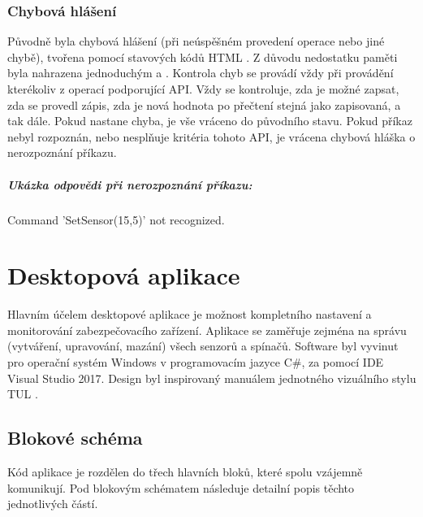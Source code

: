 \documentclass[FM,DP]{tulthesis}  %
\begin{document}
\subsection{Chybová hlášení}
Původně byla chybová hlášení (při neúspěšném provedení operace nebo jiné chybě), tvořena pomocí stavových kódů HTML \cite{HTML1.1}. Z důvodu nedostatku paměti byla nahrazena jednoduchým  a . Kontrola chyb se provádí vždy při provádění kterékoliv z operací podporující API. Vždy se kontroluje, zda je možné zapsat, zda se provedl zápis, zda je nová hodnota po přečtení stejná jako zapisovaná, a tak dále. Pokud nastane chyba, je vše vráceno do původního stavu. Pokud příkaz nebyl rozpoznán, nebo nesplňuje kritéria tohoto API, je vrácena chybová hláška o nerozpoznání příkazu.
\paragraph{Ukázka odpovědi při nerozpoznání příkazu:}
\begin{center}
Command 'SetSensor(15,5)' not recognized.
\end{center} 


\chapter{Desktopová aplikace}
Hlavním účelem desktopové aplikace je možnost kompletního nastavení a monitorování zabezpečovacího zařízení. Aplikace se zaměřuje zejména na správu (vytváření, upravování, mazání) všech senzorů a spínačů. Software byl vyvinut pro operační systém Windows v programovacím jazyce C\#, za pomocí IDE Visual Studio 2017. Design byl inspirovaný manuálem jednotného vizuálního stylu TUL \cite{TULVisual}.

\section{Blokové schéma}
Kód aplikace je rozdělen do třech hlavních bloků, které spolu vzájemně komunikují. Pod blokovým schématem následuje detailní popis těchto jednotlivých částí.
\end{document}

